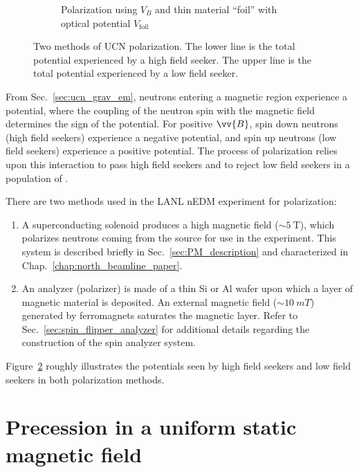 \begin{figure}
\begin{subfigure}{.5\textwidth}
  \caption{Polarization using $V_B$ and thin \newline material ``foil'' with optical potential $V_\text{foil}$}\label{subfig:polarization_foil}
\end{subfigure}
\caption
{Two methods of UCN polarization.  The lower line is the total potential experienced by a high field seeker.  The upper line is the total potential experienced by a low field seeker.}
\label{fig:polarization_methods}
\end{figure}

From Sec.~\ref{sec:ucn_grav_em}, neutrons entering a magnetic region experience a potential, where the coupling of the neutron spin with the magnetic field determines the sign of the potential. For positive $\vv{B}$, spin down neutrons (high field seekers) experience a negative potential, and spin up neutrons (low field seekers) experience a positive potential. The process of polarization relies upon this interaction to pass high field seekers and to reject low field seekers in a population of \ucn.

There are two methods used in the LANL nEDM experiment for \ucn polarization: 
%
\begin{enumerate}
    \item A superconducting solenoid produces a high magnetic field ($\sim \qty{5}{\tesla}$), which polarizes neutrons coming from the \ucn source for use in the experiment. This system is described briefly in Sec.~\ref{sec:PM_description} and characterized in Chap.~\ref{chap:north_beamline_paper}.
    \item An analyzer (polarizer) is made of a thin Si or Al wafer upon which a layer of magnetic material is deposited. An external magnetic field ($\sim \qty{10}{mT}$) generated by ferromagnets saturates the magnetic layer. Refer to Sec.~\ref{sec:spin_flipper_analyzer} for additional details regarding the construction of the spin analyzer system.
\end{enumerate}
%
Figure~\ref{fig:polarization_methods} roughly illustrates the potentials seen by high field seekers and low field seekers in both polarization methods.



\section{Precession in a uniform static magnetic field\label{sec:larmor}}

